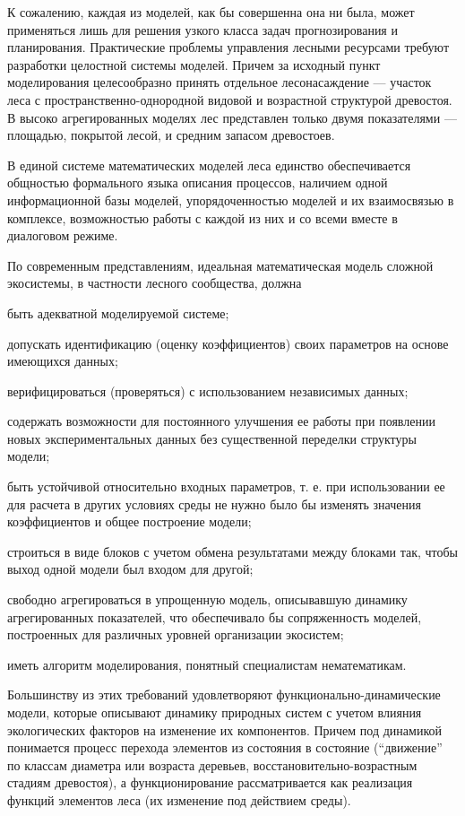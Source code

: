 \documentclass{report}
\begin{document}
К сожалению, каждая из моделей, как бы совершенна она ни была, может применяться лишь для решения узкого класса задач
прогнозирования и планирования. Практические проблемы управ\-ления лесными ресурсами требуют  разработки целостной
системы моделей. Причем за исходный пункт моделирования целесообразно принять отдельное лесонасаждение — участок леса с
пространственно-однородной видовой и возрастной структурой древостоя. В высоко агрегированных моделях лес представлен
только двумя показателями — площадью, покрытой лесой, и средним запасом древостоев.

В единой системе математических моделей леса единство обеспечивается общностью фор\-мального языка описания процессов,
наличием одной информацион\-ной базы моделей, упорядоченностью моделей и их взаимосвязью в комплексе, возможностью
работы с каждой из них и со всеми вместе в диалоговом режиме.

По современным представлениям, идеальная математическая модель сложной экосистемы, в частности лесного сообщества,
должна

быть адекватной моделируемой системе;

допускать идентификацию (оценку коэффициентов) своих параметров на основе имеющихся данных;

верифицироваться (проверяться) с использованием независи\-мых данных;

содержать возможности для постоянного улучшения ее работы при появлении новых экспериментальных данных без
существен\-ной переделки структуры модели;

быть устойчивой относительно входных параметров, т. е. при использовании ее для расчета в других условиях среды не нужно
было бы изменять значения коэффициентов и общее построение модели;

строиться в виде блоков с учетом обмена результатами между блоками так, чтобы выход одной модели был входом для другой;

свободно агрегироваться в упрощенную модель, описывавшую динамику агрегированных показателей, что обеспечивало бы
сопряженность моделей, построенных для различных уровней организации экосистем;

иметь алгоритм моделирования, понятный специалистам нематематикам.

Большинству из этих требований удовлетворяют функционально-динамические модели, которые описывают динамику природных
систем с учетом влияния экологических факторов на изменение их компонентов. Причем под динамикой понимается процесс
перехода элементов из состояния в состояние (“движение” по классам диаметра или возраста деревьев,
восстановительно-возрастным стадиям древостоя), а функционирование рассматривается как реализация функций элементов
леса (их изменение под действием среды).
\end{document}
